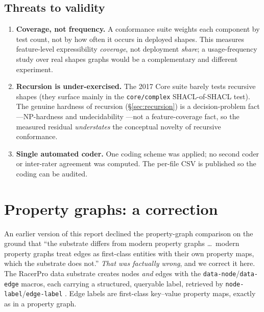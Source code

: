\documentclass[11pt,letterpaper]{article}
\theoremstyle{definition}
\newcommand{\racer}{RacerPro}
\begin{document}
\subsection{Threats to validity}
\begin{enumerate}[leftmargin=2em]
  \item \textbf{Coverage, not frequency.} A conformance suite weights each component by test count, not by how often it occurs in deployed shapes. This measures feature-level expressibility \emph{coverage}, not deployment \emph{share}; a usage-frequency study over real shapes graphs would be a complementary and different experiment.
  \item \textbf{Recursion is under-exercised.} The 2017 Core suite barely tests recursive shapes (they surface mainly in the \texttt{core/complex} SHACL-of-SHACL test). The genuine hardness of recursion (\S\ref{sec:recursion}) is a decision-problem fact---NP-hardness and undecidability \cite{recshacl,satcont}---not a feature-coverage fact, so the measured residual \emph{understates} the conceptual novelty of recursive conformance.
  \item \textbf{Single automated coder.} One coding scheme was applied; no second coder or inter-rater agreement was computed. The per-file CSV is published so the coding can be audited.
\end{enumerate}

\section{Property graphs: a correction}\label{sec:declined}

An earlier version of this report declined the property-graph comparison on the ground that ``the substrate differs from modern property graphs \dots\ modern property graphs treat edges as first-class entities with their own property maps, which the substrate does not.'' \emph{That was factually wrong}, and we correct it here. The \racer{} data substrate creates nodes \emph{and} edges with the \texttt{data-node}/\texttt{data-edge} macros, each carrying a structured, queryable label, retrieved by \texttt{node-label}/\texttt{edge-label} \cite[pp.~137--139]{racerug}. Edge labels are first-class key--value property maps, exactly as in a property graph.
\end{document}
